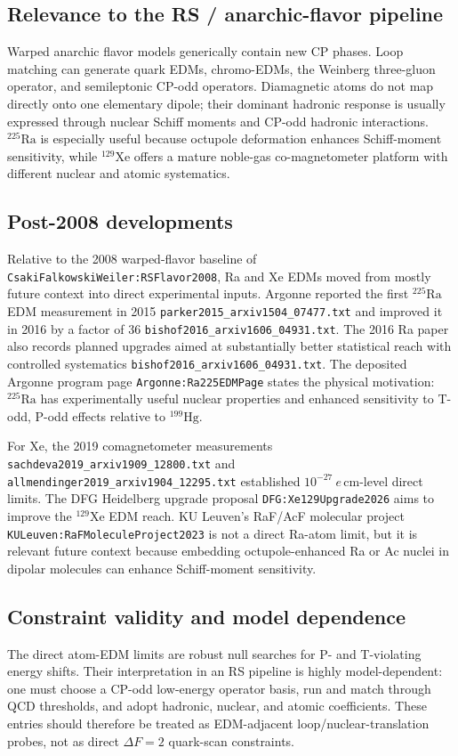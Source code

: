 \subsection*{Relevance to the RS / anarchic-flavor pipeline}
Warped anarchic flavor models generically contain new CP phases.  Loop
matching can generate quark EDMs, chromo-EDMs, the Weinberg three-gluon
operator, and semileptonic CP-odd operators.  Diamagnetic atoms do not map
directly onto one elementary dipole; their dominant hadronic response is
usually expressed through nuclear Schiff moments and CP-odd hadronic
interactions.  \(^{225}\mathrm{Ra}\) is especially useful because octupole
deformation enhances Schiff-moment sensitivity, while \(^{129}\mathrm{Xe}\)
offers a mature noble-gas co-magnetometer platform with different nuclear and
atomic systematics.

\subsection*{Post-2008 developments}
Relative to the 2008 warped-flavor baseline of
\texttt{CsakiFalkowskiWeiler:RSFlavor2008}, Ra and Xe EDMs moved from mostly
future context into direct experimental inputs.  Argonne reported the first
\(^{225}\mathrm{Ra}\) EDM measurement in 2015
\texttt{parker2015\_arxiv1504\_07477.txt} and improved it in 2016 by a
factor of \(36\) \texttt{bishof2016\_arxiv1606\_04931.txt}.  The 2016 Ra
paper also records planned upgrades aimed at substantially better statistical
reach with controlled systematics \texttt{bishof2016\_arxiv1606\_04931.txt}.
The deposited Argonne program page \texttt{Argonne:Ra225EDMPage} states the
physical motivation: \(^{225}\mathrm{Ra}\) has experimentally useful nuclear
properties and enhanced sensitivity to T-odd, P-odd effects relative to
\(^{199}\mathrm{Hg}\).

For Xe, the 2019 comagnetometer measurements
\texttt{sachdeva2019\_arxiv1909\_12800.txt} and
\texttt{allmendinger2019\_arxiv1904\_12295.txt} established
\(10^{-27}\ e\,\mathrm{cm}\)-level direct limits.  The DFG
Heidelberg upgrade proposal \texttt{DFG:Xe129Upgrade2026} aims to improve
the \(^{129}\mathrm{Xe}\) EDM reach.  KU Leuven's RaF/AcF
molecular project \texttt{KULeuven:RaFMoleculeProject2023} is not a direct
Ra-atom limit, but it is relevant future context because embedding
octupole-enhanced Ra or Ac nuclei in dipolar molecules can enhance
Schiff-moment sensitivity.

\subsection*{Constraint validity and model dependence}
The direct atom-EDM limits are robust null searches for P- and T-violating
energy shifts.  Their interpretation in an RS pipeline is highly
model-dependent: one must choose a CP-odd low-energy operator basis, run and
match through QCD thresholds, and adopt hadronic, nuclear, and atomic
coefficients.  These entries should therefore be treated as EDM-adjacent
loop/nuclear-translation probes, not as direct \(\Delta F=2\) quark-scan
constraints.

